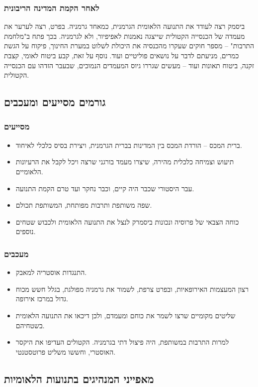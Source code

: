 \documentclass[]{article}
\begin{document}
	\subsubsection{לאחר הקמת המדינה הריבונית}
	ביסמק רצה לעודד את התנועה הלאומית הגרמנית, כמאחד גרמניה. בפרט, רצה לערער את מעמדה של הכנסייה הקטולית שייצגה נאמנות לאפיפיור, ולא לגרמניה. בכך פתח ב"מלחמת התרבות" – מספר חוקים שעקרו מהכנסיה את היכולת לשלוט במערת החינוך, פיקוח על הגשת כמרים, מניעתם לדבר על נושאים פוליטיים ועוד. נוסף על זאת, קבע ביטוח לאומי, קצבת זקנה, ביטוח תאונות ועוד – מעשים שגררו גיוס המעמדים הנמוכים, שבעבר הזדהו עם הכנסייה הקטולית. 
	
	\subsection{גורמים מסייעים ומעכבים}
	\subsubsection{מסייעים}
	\begin{itemize}
		\item ברית המכס – הורדת המכס בין המדינות בברית הגרמנית, ויצירת בסיס כלכלי לאיחוד. 
		\item תיעוש וצמיחה כלכלית מהירה, שיצרו מעמד בורגני שרצה ויכל לקבל את הרעיונות הלאומיים. 
		\item עבר היסטורי שכבר היה קיים, וכבר נחקר ועד טרם הקמת התנועה. 
		\item שפה משותפת ותרבות מפותחת, המשותפת תכולם. 
		\item כוחה הצבאי של פרוסיה ונכונות ביסמרק לנצל את התנועה הלאומית ולכבוש שטחים נוספים. 
	\end{itemize}
	\subsubsection{מעכבים}
	\begin{itemize}
		\item התנגדות אוסטריה למאבק. 
		\item רצון המעצמות האירופאיות, ובפרט צרפת, לשמור את גרמניה מפולגת, בגלל חשש מכוח גדול במרכז אירופה. 
		\item שליטים מקומיים שרצו לשמר את כוחם ומעמדם, ולכן דיכאו את התנועה הלאומית בשטחיהם. 
		\item למרות התרבות במשותפת, היה פיצול דתי בגרמניה. הקטולים העדיפו את היקסר האוסטרי, וחששו משליט פרוטסטנטי. 
	\end{itemize}
	
	\subsection{מאפייני המנהיגים בתנועות הלאומיות}
	
\end{document}

